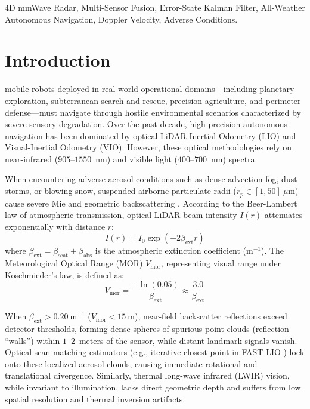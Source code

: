 \documentclass[lettersize,journal]{IEEEtran}
\begin{document}
\begin{IEEEkeywords}
4D mmWave Radar, Multi-Sensor Fusion, Error-State Kalman Filter, All-Weather Autonomous Navigation, Doppler Velocity, Adverse Conditions.
\end{IEEEkeywords}

\section{Introduction}
 mobile robots deployed in real-world operational domains---including planetary exploration, subterranean search and rescue, precision agriculture, and perimeter defense---must navigate through hostile environmental scenarios characterized by severe sensory degradation. 
Over the past decade, high-precision autonomous navigation has been dominated by optical LiDAR-Inertial Odometry (LIO) \cite{shan2020lio, xu2021fast} and Visual-Inertial Odometry (VIO). 
However, these optical methodologies rely on near-infrared ($905\text{--}1550$~nm) and visible light ($400\text{--}700$~nm) spectra. 

When encountering adverse aerosol conditions such as dense advection fog, dust storms, or blowing snow, suspended airborne particulate radii ($r_p \in [1, 50]~\mu\text{m}$) cause severe Mie and geometric backscattering \cite{bijelic2020seeing}. 
According to the Beer-Lambert law of atmospheric transmission, optical LiDAR beam intensity $I(r)$ attenuates exponentially with distance $r$:
\begin{equation}
I(r) = I_0 \exp(-2 \beta_{\mathrm{ext}} r)
\end{equation}
where $\beta_{\mathrm{ext}} = \beta_{\mathrm{scat}} + \beta_{\mathrm{abs}}$ is the atmospheric extinction coefficient ($\mathrm{m}^{-1}$). 
The Meteorological Optical Range (MOR) $V_{\mathrm{mor}}$, representing visual range under Koschmieder's law, is defined as:
\begin{equation}
V_{\mathrm{mor}} = \frac{-\ln(0.05)}{\beta_{\mathrm{ext}}} \approx \frac{3.0}{\beta_{\mathrm{ext}}}
\end{equation}

When $\beta_{\mathrm{ext}} > 0.20~\mathrm{m}^{-1}$ ($V_{\mathrm{mor}} < 15~\mathrm{m}$), near-field backscatter reflections exceed detector thresholds, forming dense spheres of spurious point clouds (reflection ``walls'') within $1\text{--}2$~meters of the sensor, while distant landmark signals vanish. 
Optical scan-matching estimators (e.g., iterative closest point in FAST-LIO \cite{xu2021fast}) lock onto these localized aerosol clouds, causing immediate rotational and translational divergence. 
Similarly, thermal long-wave infrared (LWIR) vision, while invariant to illumination, lacks direct geometric depth and suffers from low spatial resolution and thermal inversion artifacts.
\end{document}
